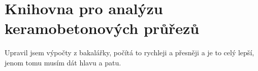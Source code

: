 \chapter{Knihovna pro analýzu keramobetonových průřezů}

Upravil jsem výpočty z bakalářky, počítá to rychleji a přesněji a je to celý lepší, jenom tomu musím dát hlavu a patu.